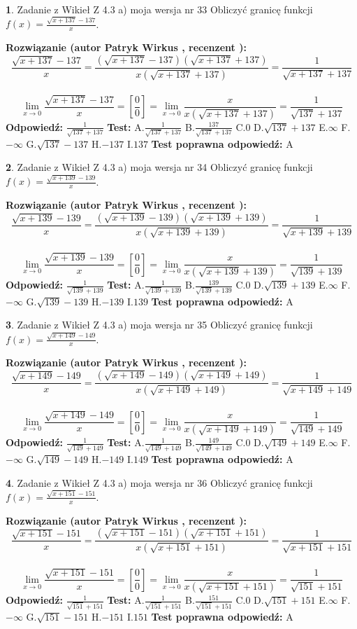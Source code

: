 \documentclass[12pt, a4paper]{article}
\theoremstyle{definition} %
\newtheorem{zad}{}
\newcommand{\zadStart}[1]{\begin{zad}#1\newline}
\newcommand{\zadStop}{\end{zad}}
\newcommand{\rozwStart}[2]{\noindent \textbf{Rozwiązanie (autor #1 , recenzent #2): }\newline}
\newcommand{\rozwStop}{\newline}
\newcommand{\odpStart}{\noindent \textbf{Odpowiedź:}\newline}
\newcommand{\odpStop}{\newline}
\newcommand{\testStart}{\noindent \textbf{Test:}\newline}
\newcommand{\testStop}{\newline}
\newcommand{\kluczStart}{\noindent \textbf{Test poprawna odpowiedź:}\newline}
\newcommand{\kluczStop}{\newline}
\begin{document}
\zadStart{Zadanie z Wikieł Z 4.3 a) moja wersja nr 33}
Obliczyć granicę funkcji $f(x)=\frac{\sqrt{x+137}-137}{x}$.
\zadStop
\rozwStart{Patryk Wirkus}{}
$$\frac{\sqrt{x+137}-137}{x}=\frac{(\sqrt{x+137}-137)(\sqrt{x+137}+137)}{x(\sqrt{x+137}+137)}=\frac{1}{\sqrt{x+137}+137}$$
\\
$$\lim\limits_{x\to0}\frac{\sqrt{x+137}-137}{x}=[\frac{0}{0}]=
\lim\limits_{x\to0}\frac{x}{x(\sqrt{x+137}+137)} = \frac{1}{\sqrt{137}+137}$$
\rozwStop
\odpStart
$\frac{1}{\sqrt{137}+137}$
\odpStop
\testStart
A.$\frac{1}{\sqrt{137}+137}$
B.$\frac{137}{\sqrt{137}+137}$
C.$0$
D.$\sqrt{137}+137$
E.$\infty$
F.$-\infty$
G.$\sqrt{137}-137$
H.$-137$
I.$137$
\testStop
\kluczStart
A
\kluczStop



\zadStart{Zadanie z Wikieł Z 4.3 a) moja wersja nr 34}
Obliczyć granicę funkcji $f(x)=\frac{\sqrt{x+139}-139}{x}$.
\zadStop
\rozwStart{Patryk Wirkus}{}
$$\frac{\sqrt{x+139}-139}{x}=\frac{(\sqrt{x+139}-139)(\sqrt{x+139}+139)}{x(\sqrt{x+139}+139)}=\frac{1}{\sqrt{x+139}+139}$$
\\
$$\lim\limits_{x\to0}\frac{\sqrt{x+139}-139}{x}=[\frac{0}{0}]=
\lim\limits_{x\to0}\frac{x}{x(\sqrt{x+139}+139)} = \frac{1}{\sqrt{139}+139}$$
\rozwStop
\odpStart
$\frac{1}{\sqrt{139}+139}$
\odpStop
\testStart
A.$\frac{1}{\sqrt{139}+139}$
B.$\frac{139}{\sqrt{139}+139}$
C.$0$
D.$\sqrt{139}+139$
E.$\infty$
F.$-\infty$
G.$\sqrt{139}-139$
H.$-139$
I.$139$
\testStop
\kluczStart
A
\kluczStop



\zadStart{Zadanie z Wikieł Z 4.3 a) moja wersja nr 35}
Obliczyć granicę funkcji $f(x)=\frac{\sqrt{x+149}-149}{x}$.
\zadStop
\rozwStart{Patryk Wirkus}{}
$$\frac{\sqrt{x+149}-149}{x}=\frac{(\sqrt{x+149}-149)(\sqrt{x+149}+149)}{x(\sqrt{x+149}+149)}=\frac{1}{\sqrt{x+149}+149}$$
\\
$$\lim\limits_{x\to0}\frac{\sqrt{x+149}-149}{x}=[\frac{0}{0}]=
\lim\limits_{x\to0}\frac{x}{x(\sqrt{x+149}+149)} = \frac{1}{\sqrt{149}+149}$$
\rozwStop
\odpStart
$\frac{1}{\sqrt{149}+149}$
\odpStop
\testStart
A.$\frac{1}{\sqrt{149}+149}$
B.$\frac{149}{\sqrt{149}+149}$
C.$0$
D.$\sqrt{149}+149$
E.$\infty$
F.$-\infty$
G.$\sqrt{149}-149$
H.$-149$
I.$149$
\testStop
\kluczStart
A
\kluczStop



\zadStart{Zadanie z Wikieł Z 4.3 a) moja wersja nr 36}
Obliczyć granicę funkcji $f(x)=\frac{\sqrt{x+151}-151}{x}$.
\zadStop
\rozwStart{Patryk Wirkus}{}
$$\frac{\sqrt{x+151}-151}{x}=\frac{(\sqrt{x+151}-151)(\sqrt{x+151}+151)}{x(\sqrt{x+151}+151)}=\frac{1}{\sqrt{x+151}+151}$$
\\
$$\lim\limits_{x\to0}\frac{\sqrt{x+151}-151}{x}=[\frac{0}{0}]=
\lim\limits_{x\to0}\frac{x}{x(\sqrt{x+151}+151)} = \frac{1}{\sqrt{151}+151}$$
\rozwStop
\odpStart
$\frac{1}{\sqrt{151}+151}$
\odpStop
\testStart
A.$\frac{1}{\sqrt{151}+151}$
B.$\frac{151}{\sqrt{151}+151}$
C.$0$
D.$\sqrt{151}+151$
E.$\infty$
F.$-\infty$
G.$\sqrt{151}-151$
H.$-151$
I.$151$
\testStop
\kluczStart
A
\kluczStop
\end{document}
